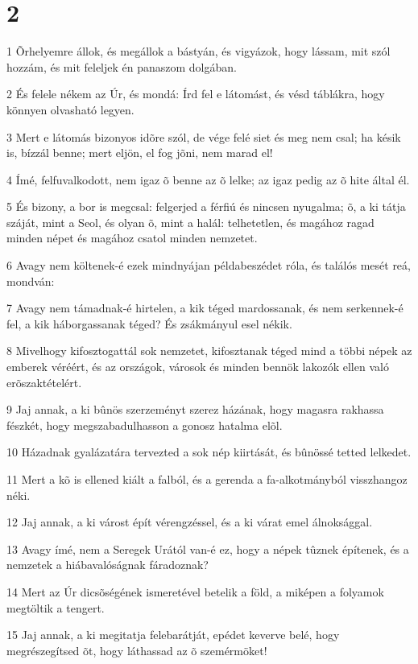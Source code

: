 \chapter{2}

\par 1 Õrhelyemre állok, és megállok a bástyán, és vigyázok, hogy lássam, mit szól hozzám, és mit feleljek én panaszom dolgában.
\par 2 És felele nékem az Úr, és mondá: Írd fel e látomást, és vésd táblákra, hogy könnyen olvasható legyen.
\par 3 Mert e látomás bizonyos idõre szól, de vége felé siet és meg nem csal; ha késik is, bízzál benne; mert eljön, el fog jõni, nem marad el!
\par 4 Ímé, felfuvalkodott, nem igaz õ benne az õ lelke; az igaz pedig az õ hite által él.
\par 5 És bizony, a bor is megcsal: felgerjed a férfiú és nincsen nyugalma; õ, a ki tátja száját, mint a Seol, és olyan õ, mint a halál: telhetetlen, és magához ragad minden népet és magához csatol minden nemzetet.
\par 6 Avagy nem költenek-é ezek mindnyájan példabeszédet róla, és találós mesét reá, mondván:
\par 7 Avagy nem támadnak-é hirtelen, a kik téged mardossanak, és nem serkennek-é fel, a kik háborgassanak téged? És zsákmányul esel nékik.
\par 8 Mivelhogy kifosztogattál sok nemzetet, kifosztanak téged mind a többi népek az emberek véréért, és az országok, városok és minden bennök lakozók ellen való erõszaktételért.
\par 9 Jaj annak, a ki bûnös szerzeményt szerez házának, hogy magasra rakhassa fészkét, hogy megszabadulhasson a gonosz hatalma elõl.
\par 10 Házadnak gyalázatára tervezted a sok nép kiirtását, és bûnössé tetted lelkedet.
\par 11 Mert a kõ is ellened kiált a falból, és a gerenda a fa-alkotmányból visszhangoz néki.
\par 12 Jaj annak, a ki várost épít vérengzéssel, és a ki várat emel álnoksággal.
\par 13 Avagy ímé, nem a Seregek Urától van-é ez, hogy a népek tûznek építenek, és a nemzetek a hiábavalóságnak fáradoznak?
\par 14 Mert az Úr dicsõségének ismeretével betelik a föld, a miképen a folyamok megtöltik a tengert.
\par 15 Jaj annak, a ki megitatja felebarátját, epédet keverve belé, hogy megrészegítsed õt, hogy láthassad az õ szemérmöket!
